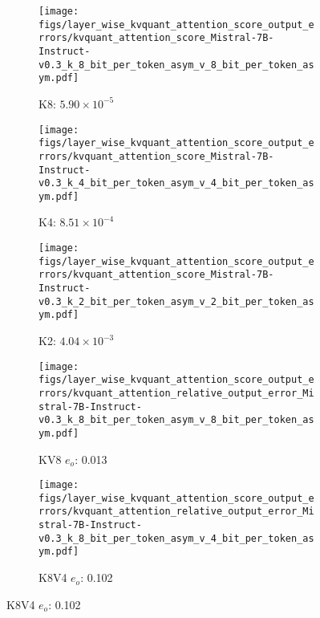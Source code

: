 %
%
\begin{figure}
    \centering
    \begin{subfigure}{0.25\columnwidth}
    \texttt{[image: figs/layer\_wise\_kvquant\_attention\_score\_output\_errors/kvquant\_attention\_score\_Mistral-7B-Instruct-v0.3\_k\_8\_bit\_per\_token\_asym\_v\_8\_bit\_per\_token\_asym.pdf]}
    \caption{K8: $5.90\times 10^{-5}$}
    \label{fig:kvcache_simulated_quant_attention_score_error_layer_wise_k8v8_per_token_asym_Mistral-7B-Instruct-v0.3}
    \end{subfigure}
    \begin{subfigure}{0.25\columnwidth}
    \texttt{[image: figs/layer\_wise\_kvquant\_attention\_score\_output\_errors/kvquant\_attention\_score\_Mistral-7B-Instruct-v0.3\_k\_4\_bit\_per\_token\_asym\_v\_4\_bit\_per\_token\_asym.pdf]}
    \caption{K4: $8.51\times 10^{-4}$}
    \label{fig:kvcache_simulated_quant_attention_score_error_layer_wise_k4v4_per_token_asym_Mistral-7B-Instruct-v0.3}
    \end{subfigure}
    \begin{subfigure}{0.25\columnwidth}
    \texttt{[image: figs/layer\_wise\_kvquant\_attention\_score\_output\_errors/kvquant\_attention\_score\_Mistral-7B-Instruct-v0.3\_k\_2\_bit\_per\_token\_asym\_v\_2\_bit\_per\_token\_asym.pdf]}
    \caption{K2: $4.04\times 10^{-3}$}
    \label{fig:kvcache_simulated_quant_attention_score_error_layer_wise_k2v2_per_token_asym_Mistral-7B-Instruct-v0.3}
    \end{subfigure}
    \begin{subfigure}{0.25\columnwidth}
    \texttt{[image: figs/layer\_wise\_kvquant\_attention\_score\_output\_errors/kvquant\_attention\_relative\_output\_error\_Mistral-7B-Instruct-v0.3\_k\_8\_bit\_per\_token\_asym\_v\_8\_bit\_per\_token\_asym.pdf]}
    \caption{KV8 $e_o$: 0.013}
    \label{fig:kvcache_simulated_quant_error_layer_wise_k8v8_per_token_asym_Mistral-7B-Instruct-v0.3}
    \end{subfigure}
    \begin{subfigure}{0.25\columnwidth}
    \texttt{[image: figs/layer\_wise\_kvquant\_attention\_score\_output\_errors/kvquant\_attention\_relative\_output\_error\_Mistral-7B-Instruct-v0.3\_k\_8\_bit\_per\_token\_asym\_v\_4\_bit\_per\_token\_asym.pdf]}
    \caption{K8V4 $e_o$: 0.102}
    \label{fig:kvcache_simulated_quant_error_layer_wise_k8v4_per_token_asym_Mistral-7B-Instruct-v0.3}
    \end{subfigure}

\end{figure}
